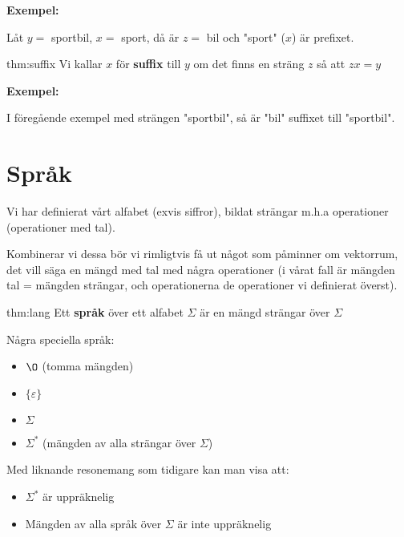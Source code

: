 \par\bigskip
\noindent\textbf{Exempel:}\par
\noindent Låt $y = $ sportbil, $x=$ sport, då är $z=$ bil och "sport" ($x$) är prefixet.
\par\bigskip
\begin{theo}[Suffix]{thm:suffix}
  Vi kallar $x$ för \textbf{suffix} till $y$ om det finns en sträng $z$ så att $zx=y$ 
\end{theo}
\par\bigskip
\noindent\textbf{Exempel:}\par
\noindent I föregående exempel med strängen "sportbil", så är "bil" suffixet till "sportbil".
\newpage
\section{Språk}
\par\bigskip
\noindent Vi har definierat vårt alfabet (exvis siffror), bildat strängar m.h.a operationer (operationer med tal).\par
\noindent Kombinerar vi dessa bör vi rimligtvis få ut något som påminner om vektorrum, det vill säga en mängd med tal med några operationer (i vårat fall är mängden tal = mängden strängar, och operationerna de operationer vi definierat överst).
\par\bigskip
\begin{theo}[Språk]{thm:lang}
  Ett \textbf{språk} över ett alfabet $\Sigma$ är en mängd strängar över $\Sigma$
  \par\bigskip
  \noindent Några speciella språk:
  \begin{itemize}
    \item $\O$ (tomma mängden)
    \item $\{\varepsilon\}$
    \item $\Sigma$
    \item $\Sigma^*$ (mängden av alla strängar över $\Sigma$)
  \end{itemize}
\end{theo}
\par\bigskip
\noindent Med liknande resonemang som tidigare kan man visa att:
\begin{itemize}
  \item $\Sigma^*$ är uppräknelig
  \item Mängden av alla språk över $\Sigma$ är inte uppräknelig
\end{itemize}
\par\bigskip
